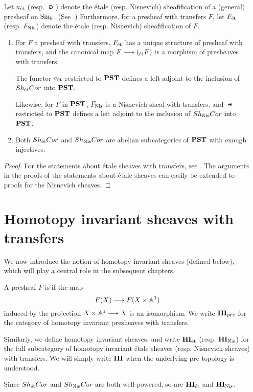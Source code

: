 Let $a_{\mathrm{\acute{e}t}}$ (resp. $\nis$) denote the \'etale (resp. Nisnevich)
sheafification of a (general) presheaf on $\mathrm{Sm}_{k}$. (See
\cite[3.1.1]{Tamme}.) Furthermore, for a presheaf with transfers $F$,
let $F_{\mathrm{\acute{e}t}}$ (resp. $F_{\mathrm{Nis}}$) denote the \'etale (resp.
Nisnevich) sheafification of $F$.

\begin{prop}\label{prop_et_and_nis_sheafification}
\begin{enumerate}
\item For $F$ a presheaf with transfers, $F_{\mathrm{\acute{e}t}}$ has a
unique structure of presheaf with transfers, and the canonical
map $F \longrightarrow (_{\mathrm{\acute{e}t}}F)$ is a morphism of presheaves with transfers.

The functor $a_{\mathrm{\acute{e}t}}$ restricted to $\mathbf{PST}$ defines a left adjoint
to the inclusion of $Sh_{\mathrm{\acute{e}t}}Cor$ into $\mathbf{PST}$. 

Likewise, for $F$ in $\mathbf{PST}$, $F_{\mathrm{Nis}}$ is a Nisnevich sheaf with
transfers, and $\nis$ restricted to $\mathbf{PST}$ defines a left adjoint 
to the inclusion of $Sh_{\mathrm{Nis}}Cor$ into $\mathbf{PST}$. 

\item Both $Sh_{\mathrm{\acute{e}t}}Cor$ and $Sh_{\mathrm{Nis}}Cor$ are abelian 
subcategories of $\mathbf{PST}$ with enough injectives.
\end{enumerate}
\end{prop}
\begin{proof}
For the statements about \'etale sheaves with transfers, see 
\cite[6.17, 6.18 and 6.19]{MVW}. The arguments in the proofs of the
statements about \'etale sheaves can easily be extended to proofs
for the Nisnevich sheaves.
\end{proof}

\section{Homotopy invariant sheaves with transfers}

We now introduce the notion of homotopy invariant sheaves (defined
below), which will play a central role in the subsequent chapters.

\begin{defn}
A presheaf $F$ is  if the map 
\[
F(X) \longrightarrow F(X \times \mathbb{A}^1)
\]
induced by the projection $X \times \mathbb{A}^1 \longrightarrow X$ is an isomorphism.
We write $\mathbf{HI}_{pre}$ for the category of homotopy invariant 
presheaves with transfers.

Similarly, we define homotopy invariant sheaves, and write $\mathbf{HI}_{\mathrm{\acute{e}t}}$ 
(resp. $\mathbf{HI}_{\mathrm{Nis}}$) for the full subcategory of homotopy invariant 
\'etale sheaves (resp. Nisnevich sheaves) with transfers. We will 
simply write $\mathbf{HI}$ when the underlying pre-topology is understood.

Since $Sh_{\mathrm{\acute{e}t}}Cor$ and $Sh_{\mathrm{Nis}}Cor$ are both well-powered, so are 
$\mathbf{HI}_{\mathrm{\acute{e}t}}$ and $\mathbf{HI}_{\mathrm{Nis}}$.
\end{defn}

